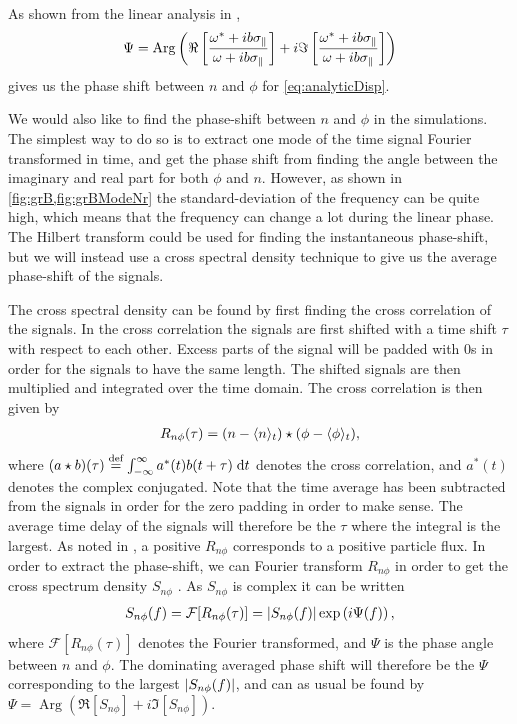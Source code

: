 As shown from the linear analysis in \cite{Pecseli2016book},
%
\begin{align}
    \Psi = \operatorname{Arg}\left(
    \Re\left[\frac{\omega^*+ib\sigma_\|}{\omega+ib\sigma_\|}\right]
    +i\Im\left[\frac{\omega^*+ib\sigma_\|}{\omega+ib\sigma_\|}\right]
    \right)
    \label{eq:analPhase}
\end{align}
%
gives us the phase shift between $n$ and $\phi$ for \cref{eq:analyticDisp}.

We would also like to find the phase-shift between $n$ and $\phi$ in the simulations.
The simplest way to do so is to extract one mode of the time signal Fourier transformed in time, and get the phase shift from finding the angle between the imaginary and real part for both $\phi$ and $n$.
However, as shown in \cref{fig:grB,fig:grBModeNr} the standard-deviation of the frequency can be quite high, which means that the frequency can change a lot during the linear phase.
The Hilbert transform could be used for finding the instantaneous phase-shift, but we will instead use a cross spectral density technique to give us the average phase-shift of the signals.

The cross spectral density can be found by first finding the cross correlation of the signals.
In the cross correlation the signals are first shifted with a time shift $\tau$ with respect to each other.
Excess parts of the signal will be padded with $0$s in order for the signals to have the same length.
The shifted signals are then multiplied and integrated over the time domain.
The cross correlation is then given by
%
\begin{align*}
    R_{n\phi}(\tau) = (n-\langle{n}\rangle_t) \star (\phi-\langle{\phi}\rangle_t),
\end{align*}
%
where $(a \star b)(\tau) \overset{\text{def}}{=} \int_{-\infty }^{\infty} {a^{*}(t) b(t+\tau )} \; \text{d} {t}$ denotes the cross correlation, and $a^*(t)$ denotes the complex conjugated.
Note that the time average has been subtracted from the signals in order for the zero padding in order to make sense.
The average time delay of the signals will therefore be the $\tau$ where the integral is the largest.
As noted in \cite{Huld1988}, a positive $R_{n\phi}$ corresponds to a positive particle flux.
In order to extract the phase-shift, we can Fourier transform $R_{n\phi}$ in order to get the cross spectrum density $S_{n\phi}$ .
As $S_{n\phi}$ is complex it can be written
%
\begin{align*}
    S_{n\phi}(f) = \mathcal{F}[R_{n\phi}(\tau)] = \left|S_{n\phi}(f)\right|\exp\left(i\Psi(f)\right),
\end{align*}
%
where $\mathcal{F}[R_{n\phi}(\tau)]$ denotes the Fourier transformed, and $\Psi$ is the phase angle between $n$ and $\phi$.
The dominating averaged phase shift will therefore be the $\Psi$ corresponding to the largest $\left|S_{n\phi}(f)\right|$, and can as usual be found by $\Psi = \operatorname{Arg}(\Re[S_{n\phi}]+i\Im[S_{n\phi}])$.

